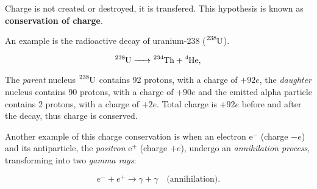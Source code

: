 \documentclass[letterpaper,12pt]{article}
\begin{document}
Charge is not created or destroyed, it is transfered. This hypothesis is known as \textbf{conservation of charge}.

An example is the radioactive decay of uranium-238 ($\ce{^{238}_{}U}$).

\begin{equation}
	\ce{^{238}_{}U -> ^{234}_{}Th + ^{4}_{}He,}
\end{equation}

The \textit{parent} nucleus $\ce{^{238}_{}U}$ contains 92 protons, with a charge of $+92e$, the \textit{daughter} nucleus  contains 90 protons, with a charge of $+90e$ and the emitted alpha particle  contains 2 protons, with a charge of $+2e$. Total charge is $+92e$ before and after the decay, thus charge is conserved.

Another example of this charge conservation is when an electron $\mathrm{e}^-$ (charge $-e$) and its antiparticle, the \textit{positron} $\mathrm{e}^+$ (charge $+e$), undergo an \textit{annihilation process}, transforming into two \textit{gamma rays}:

\begin{equation}
	e^- + e^+ \longrightarrow \gamma + \gamma \quad \text{(annihilation).}
\end{equation}
\end{document}

